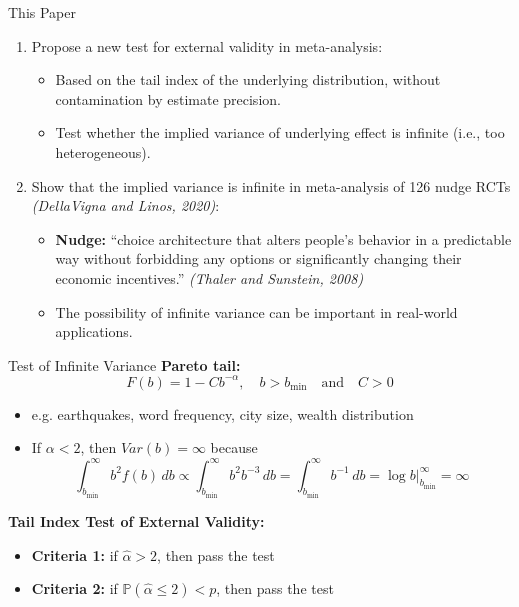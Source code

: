 \documentclass{beamer} %
\begin{document}
\begin{frame}{This Paper}
    \begin{enumerate}
        \item Propose a new test for external validity in meta-analysis:
        \begin{itemize}
            \item Based on the tail index of the underlying distribution, without contamination by estimate precision.
            \item Test whether the implied variance of underlying effect is infinite (i.e., too heterogeneous).
        \end{itemize}
        
        \bigskip
        
        \item Show that the implied variance is infinite in meta-analysis of 126 nudge RCTs \textit{(DellaVigna and Linos, 2020)}:
        \begin{itemize}
            \item \textbf{Nudge:} ``choice architecture that alters people's behavior in a predictable way without forbidding any options or significantly changing their economic incentives.'' \textit{(Thaler and Sunstein, 2008)}
            \item The possibility of infinite variance can be important in real-world applications.
        \end{itemize}
    \end{enumerate}
\end{frame}

\begin{frame}{Test of Infinite Variance}
    \textbf{Pareto tail:}
    \[
    F(b) = 1 - Cb^{-\alpha}, \quad b > b_{\text{min}} \quad \text{and} \quad C > 0
    \]

    \begin{itemize}
        \item e.g. earthquakes, word frequency, city size, wealth distribution
        \item If $\alpha < 2$, then $V\!ar(b) = \infty$ because
        \[
        \int_{b_{\text{min}}}^\infty b^2 f(b) \, db \propto \int_{b_{\text{min}}}^\infty b^2 b^{-3} \, db = \int_{b_{\text{min}}}^\infty b^{-1} \, db = \log b \big|_{b_{\text{min}}}^\infty = \infty
        \]
    \end{itemize}
    
    \bigskip
    
    \textbf{Tail Index Test of External Validity:}
    \begin{itemize}
        \item \textbf{Criteria 1:} if $\hat{\alpha} > 2$, then pass the test
        \item \textbf{Criteria 2:} if $\mathbb{P}(\hat{\alpha} \leq 2) < p$, then pass the test
    \end{itemize}
\end{frame}
\end{document}
